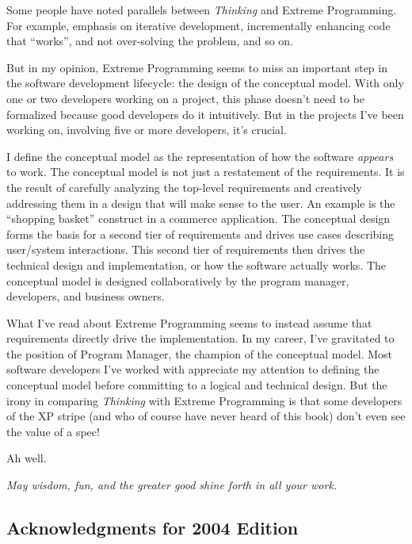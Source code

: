 Some people have noted parallels between \emph{Thinking \Forth{}} and
Extreme Programming. For example, emphasis on iterative development,
incrementally enhancing code that ``works'', and not over-solving the
problem, and so on.

But in my opinion, Extreme Programming seems to miss an important step
in the software development lifecycle: the design of the conceptual
model. With only one or two developers working on a project, this
phase doesn't need to be formalized because good developers do it
intuitively. But in the projects I've been working on, involving five
or more developers, it's crucial.

I define the conceptual model as the representation of how the
software \emph{appears} to work. The conceptual model is not just a
restatement of the requirements. It is the result of carefully
analyzing the top-level requirements and creatively addressing them in
a design that will make sense to the user. An example is the
``shopping basket'' construct in a commerce application. The
conceptual design forms the basis for a second tier of requirements
and drives use cases describing user/system interactions. This second
tier of requirements then drives the technical design and
implementation, or how the software actually works. The conceptual
model is designed collaboratively by the program manager, developers,
and business owners.

What I've read about Extreme Programming seems to instead assume that
requirements directly drive the implementation. In my career, I've
gravitated to the position of Program Manager, the champion of the
conceptual model. Most software developers I've worked with appreciate
my attention to defining the conceptual model before committing to a
logical and technical design. But the irony in comparing \emph{Thinking
\Forth{}} with Extreme Programming is that some developers of the XP
stripe (and who of course have never heard of this book) don't even
see the value of a spec!

Ah well.

\begin{flushright}
\emph{May wisdom, fun, and the greater good shine forth in all your work.}

\vspace{5em}
\vspace{2.5em}
\end{flushright}

\subsection{Acknowledgments for 2004 Edition}

